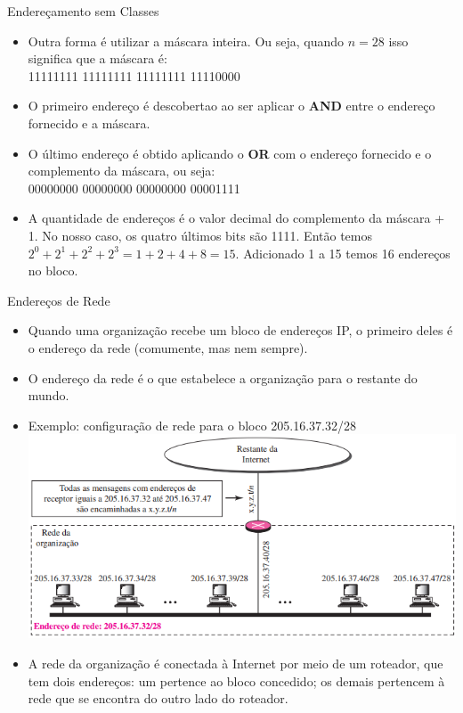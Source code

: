 \documentclass{libs/ufc_format}
\begin{document}
\begin{frame}{Endereçamento sem Classes}
    \begin{itemize}
        \justifying
        \item Outra forma é utilizar a máscara inteira. Ou seja, quando $n = 28$ isso significa que a máscara é: \\
        \vspace{0.1 cm}
        11111111 11111111 11111111 11110000
        \item O primeiro endereço é descobertao ao ser aplicar o \textbf{AND} entre o endereço fornecido e a máscara.
        \item O último endereço é obtido aplicando o \textbf{OR} com o endereço fornecido e o complemento da máscara, ou seja:\\
        \vspace{0.1cm}
        00000000 00000000 00000000 00001111
        \item A quantidade de endereços é o valor decimal do complemento da máscara + 1. No nosso caso, os quatro últimos bits são 1111. Então temos $2^{0} + 2^{1} + 2^{2} + 2^{3} = 1 + 2 + 4 + 8 = 15$. Adicionado 1 a 15 temos 16 endereços no bloco.
    \end{itemize}
\end{frame}

\begin{frame}{Endereços de Rede}
    \begin{itemize}
        \justifying
        \item Quando uma organização recebe um bloco de endereços IP, o primeiro deles é o endereço da rede (comumente, mas nem sempre).
        \item O endereço da rede é o que estabelece a organização para o restante do mundo.
        \item Exemplo: configuração de rede para o bloco 205.16.37.32/28\\
        \centering
        \includegraphics[scale=0.5]{figuras/figura09_01}
        \justifying
        \item A rede da organização é conectada à Internet por meio de um roteador, que tem dois endereços: um pertence ao bloco concedido; os demais pertencem à rede que se encontra do outro lado do roteador.
    \end{itemize}
\end{frame}
\end{document}

